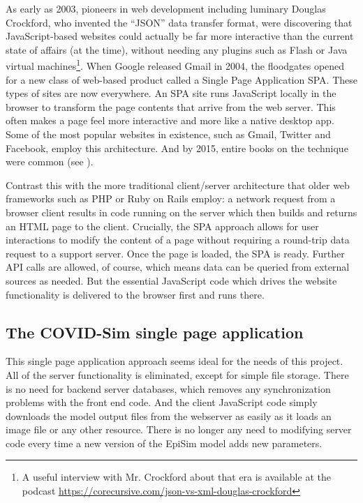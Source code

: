 As early as 2003, pioneers in web development including luminary Douglas Crockford, who invented the ``JSON'' data transfer format, were discovering that JavaScript-based websites could actually be far more interactive than the current state of affairs (at the time), without needing any plugins such as Flash or Java virtual machines\footnote{A useful interview with Mr. Crockford about that era is available at the podcast \url{https://corecursive.com/json-vs-xml-douglas-crockford}}. When Google released Gmail in 2004, the floodgates opened for a new class of web-based product called a Single Page Application \gls{SPA}. These types of sites are now everywhere. An SPA site runs JavaScript locally in the browser to transform the page contents that arrive from the web server. This often makes a page feel more interactive and more like a native desktop app. Some of the most popular websites in existence, such as Gmail, Twitter and Facebook, employ this architecture. And by 2015, entire books on the technique were common (see \cite{Scott2015spa}).

Contrast this with the more traditional client/server architecture that older web frameworks such as PHP or Ruby on Rails employ: a network request from a browser client results in code running on the server which then builds and returns an HTML page to the client. Crucially, the SPA approach allows for user interactions to modify the content of a page without requiring a round-trip data request to a support server. Once the page is loaded, the SPA is ready. Further API calls are allowed, of course, which means data can be queried from external sources as needed. But the essential JavaScript code which drives the website functionality is delivered to the browser first and runs there.

\hypertarget{covid-single-page-application}{%
\subsection{The COVID-Sim single page application}\label{covid-single-page-application}}

This single page application approach seems ideal for the needs of this project. All of the server functionality is eliminated, except for simple file storage. There is no need for backend server databases, which removes any synchronization problems with the front end code. And the client JavaScript code simply downloads the model output files from the webserver as easily as it loads an image file or any other resource. There is no longer any need to modifying server code every time a new version of the EpiSim model adds new parameters.

